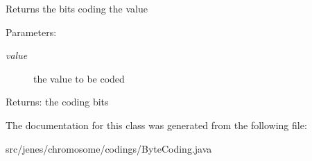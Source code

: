 Returns the bits coding the value

\begin{Desc}
\item[Parameters:]
\begin{description}
\item[{\em value}]the value to be coded \end{description}
\end{Desc}
\begin{Desc}
\item[Returns:]the coding bits \end{Desc}


The documentation for this class was generated from the following file:\begin{CompactItemize}
\item 
src/jenes/chromosome/codings/ByteCoding.java\end{CompactItemize}

